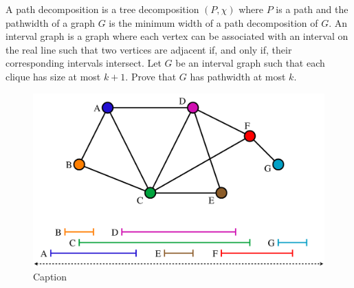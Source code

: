 \documentclass{article}
\begin{document}
\begin{exercise}
    A path decomposition is a tree decomposition $(P,\chi)$ where $P$ is a path and the pathwidth of a graph $G$ is the minimum width of a path decomposition of $G$. An interval graph is a graph where each vertex can be associated with an interval on the real line such that two vertices are adjacent if, and only if, their corresponding intervals intersect. Let $G$ be an interval graph such that each clique has size at most $k+1$. Prove that $G$ has pathwidth at most $k$.
\end{exercise}
\begin{solving}
    \begin{figure}
        \centering
        \includegraphics{4/exercise/intervalgraph.svg}
        \caption{Caption}
        \label{fig:my_label}
    \end{figure}
\end{solving}
\newpage
\end{document}
